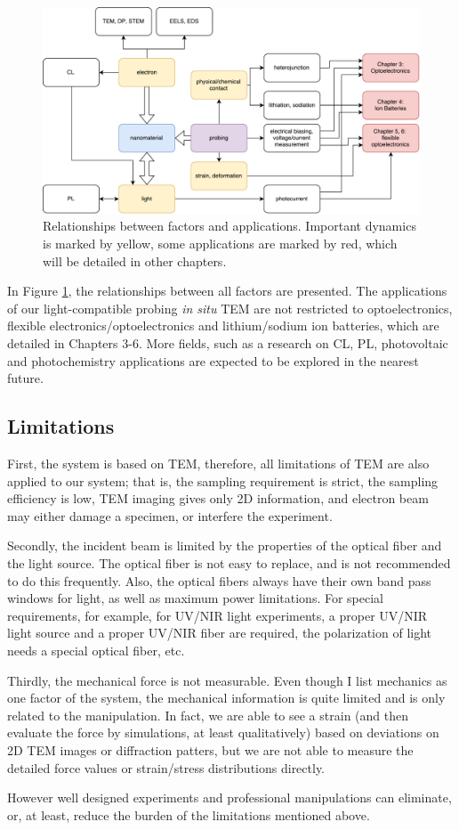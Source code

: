 \begin{figure}  
\includegraphics[width=\textwidth]{figures/figure2_apply}
\caption[Relationships between factors and applications.]{Relationships between factors and applications. Important dynamics is marked by yellow, some applications are marked by red, which will be detailed in other chapters.
\label{fig:2_apply}}
\end{figure}

In Figure \ref{fig:2_apply}, the relationships between all factors are presented. The applications of our light-compatible probing {\em in situ} TEM are not restricted to optoelectronics, flexible electronics/optoelectronics and lithium/sodium ion batteries, which are detailed in Chapters 3-6. More fields, such as a research on CL, PL, photovoltaic and photochemistry applications are expected to be explored in the nearest future. 

\subsection{Limitations}
First, the system is based on TEM, therefore, all limitations of TEM are also applied to our system; that is, the sampling requirement is strict, the sampling efficiency is low, TEM imaging gives only 2D information, and electron beam may either damage a specimen, or interfere the experiment. 

Secondly, the incident beam is limited by the properties of the optical fiber and the light source. The optical fiber is not easy to replace, and is not recommended to do this frequently. 
Also, the optical fibers always have their own band pass windows for light, as well as maximum power limitations. 
For special requirements, for example, for UV/NIR light experiments, a proper UV/NIR light source and a proper UV/NIR fiber are required, the polarization of light needs a special optical fiber, etc. 

Thirdly, the mechanical force is not measurable. Even though I list mechanics as one factor of the system, the mechanical information is quite limited and is only related to the manipulation. In fact, we are able to see a strain (and then evaluate the force by simulations, at least qualitatively) based on deviations on 2D TEM images or diffraction patters, but we are not able to measure the detailed force values or strain/stress distributions directly. 

However well designed experiments and professional manipulations can eliminate, or, at least, reduce the burden of the limitations mentioned above. 
